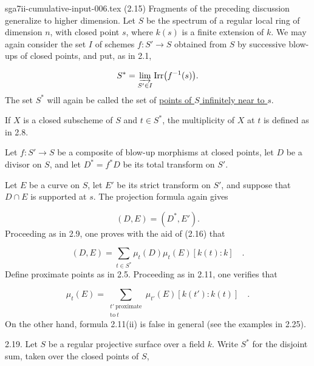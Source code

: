 \begin{filecontents*}{sga7ii-cumulative-input-006.tex}
(2.15) Fragments of the preceding discussion generalize to higher dimension.  Let
$S$ be the spectrum of a regular local ring of dimension $n$, with closed point
$s$, where $k(s)$ is a finite extension of $k$.  We may again consider the set
$I$ of schemes $f:S'\longrightarrow S$ obtained from $S$ by successive blow-ups
of closed points, and put, as in 2.1,

\begin{equation*}
S^*=\varinjlim_{S'\in I}\operatorname{Irr}\bigl(f^{-1}(s)\bigr).
\end{equation*}
The set $S^*$ will again be called the set of \underline{points of $S$
infinitely near to $s$}.

If $X$ is a closed subscheme of $S$ and $t\in S^*$, the multiplicity of $X$ at
$t$ is defined as in 2.8.

Let $f:S'\longrightarrow S$ be a composite of blow-up morphisms at closed
points, let $D$ be a divisor on $S$, and let $D^*=f^*D$ be its total transform
on $S'$.


Let $E$ be a curve on $S$, let $E'$ be its strict transform on $S'$, and suppose
that $D\cap E$ is supported at $s$.  The projection formula again gives

\begin{equation}\tag{2.16}
(D,E)=(D^*,E').
\end{equation}
Proceeding as in 2.9, one proves with the aid of (2.16) that

\begin{equation}\tag{2.17}
(D,E)=\sum_{t\in S^*}\mu_t(D)\mu_t(E)[k(t):k] \quad .
\end{equation}
Define proximate points as in 2.5.  Proceeding as in 2.11, one verifies that

\begin{equation}\tag{2.18}
\mu_t(E)=
\sum_{\substack{t'\ \mathrm{proximate}\\\mathrm{to}\ t}}
\mu_{t'}(E)[k(t'):k(t)] \quad .
\end{equation}
On the other hand, formula 2.11(ii) is false in general (see the examples in
2.25).

2.19. Let $S$ be a regular projective surface over a field $k$.  Write $S^*$
for the disjoint sum, taken over the closed points of $S$,


\end{filecontents*}
